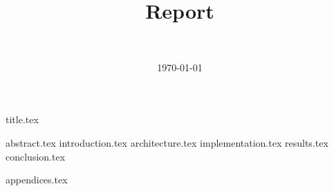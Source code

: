 \documentclass[final]{article}
\title{Report}
\author{~}
\date{\today}
\begin{document}

{title.tex}
\newpage

{abstract.tex}
{introduction.tex}
{architecture.tex}
{implementation.tex}
{results.tex}
{conclusion.tex}


\printbibliography
{appendices.tex}
\end{document}
